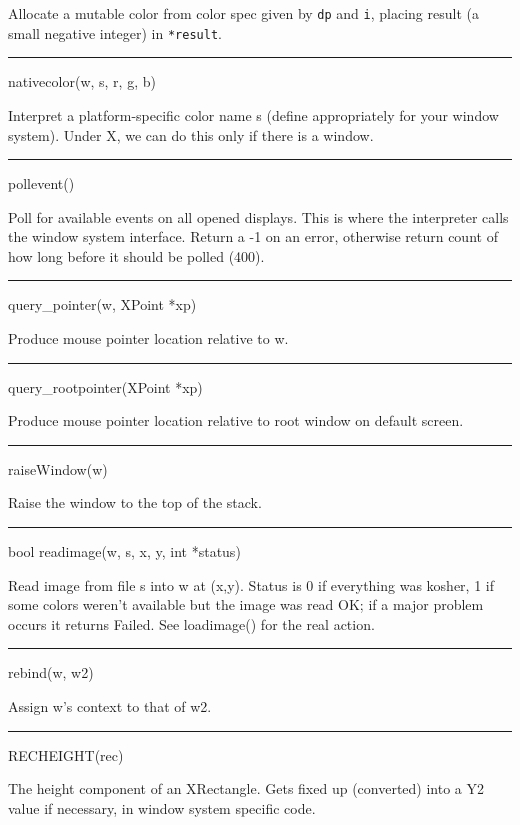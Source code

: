 Allocate a mutable color from color spec given by \texttt{dp} and
\texttt{i}, placing result (a small negative integer) in
\texttt{*result}.


{\sffamily\bfseries
\bigskip\hrule\vspace{0.1cm}
\noindent
nativecolor(w, s, r, g, b)}


Interpret a platform-specific color name s (define appropriately for
your window system). Under X, we can do this only if there is a
window.


{\sffamily\bfseries
\bigskip\hrule\vspace{0.1cm}
\noindent
pollevent()}


Poll for available events on all opened displays. This is where the
interpreter calls the window system interface. Return a -1 on an
error, otherwise return count of how long before it should be polled
(400).


{\sffamily\bfseries
\bigskip\hrule\vspace{0.1cm}
\noindent
query\_pointer(w, XPoint *xp)}


Produce mouse pointer location relative to w.


{\sffamily\bfseries
\bigskip\hrule\vspace{0.1cm}
\noindent
query\_rootpointer(XPoint *xp)}


Produce mouse pointer location relative to root window on default screen.


{\sffamily\bfseries
\bigskip\hrule\vspace{0.1cm}
\noindent
raiseWindow(w)}


Raise the window to the top of the stack.


{\sffamily\bfseries
\bigskip\hrule\vspace{0.1cm}
\noindent
bool readimage(w, s, x, y, int *status)}


Read image from file s into w at (x,y). Status is 0 if everything was
kosher, 1 if some colors weren't available but the image was read OK;
if a major problem occurs it returns Failed. See loadimage() for the
real action.


{\sffamily\bfseries
\bigskip\hrule\vspace{0.1cm}
\noindent
rebind(w, w2)}


Assign w's context to that of w2.


{\sffamily\bfseries
\bigskip\hrule\vspace{0.1cm}
\noindent
RECHEIGHT(rec)}


The height component of an XRectangle. Gets {\textquotedbl}fixed
up{\textquotedbl} (converted) into a Y2 value if necessary, in window
system specific code.


